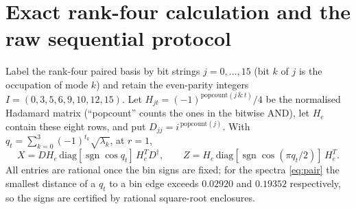 \documentclass[11pt,a4paper]{article}
\newcommand{\sgn}{\operatorname{sgn}}
\begin{document}
\appendix

\section{Exact rank-four calculation and the raw sequential protocol}
\label{app:rank4}

Label the rank-four paired basis by bit strings $j=0,\dots,15$ (bit $k$ of $j$ is the occupation of mode $k$) and retain the even-parity integers $I=(0,3,5,6,9,10,12,15)$. Let $H_{jt}=(-1)^{\mathrm{popcount}(j\,\&\,t)}/4$ be the normalised Hadamard matrix (``popcount'' counts the ones in the bitwise AND), let $H_e$ contain these eight rows, and put $D_{jj}=i^{\,\mathrm{popcount}(j)}$. With $q_t=\sum_{k=0}^3(-1)^{t_k}\sqrt{\lambda_k}$, at $r=1$,
\begin{equation}
X=DH_e\,\mathrm{diag}[\sgn\cos q_t]\,H_e^{T}D^\dagger,\qquad Z=H_e\,\mathrm{diag}[\sgn\cos(\pi q_t/2)]\,H_e^{T}.
\end{equation}
All entries are rational once the bin signs are fixed; for the spectra \eqref{eq:pair} the smallest distance of a $q_t$ to a bin edge exceeds $0.02920$ and $0.19352$ respectively, so the signs are certified by rational square-root enclosures.
\end{document}
